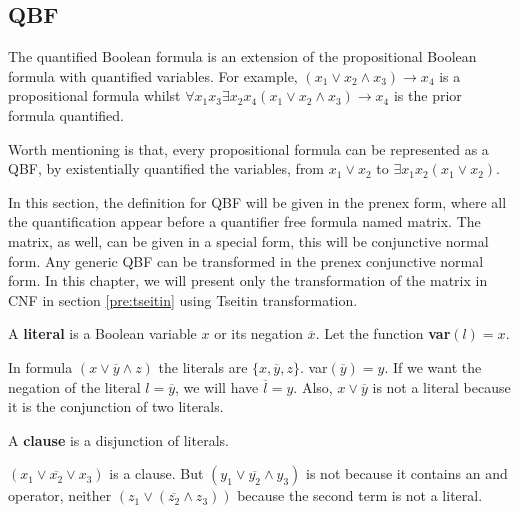 \subsection{QBF}

The quantified Boolean formula is an extension of the propositional Boolean formula with quantified variables. For example, $(x_1 \lor x_2 \land x_3) \to x_4$ is a propositional formula whilst $\forall x_1x_3 \exists x_2x_4(x_1 \lor x_2 \land x_3) \to x_4$ is the prior formula quantified.

Worth mentioning is that, every propositional formula can be represented as a QBF, by existentially quantified the variables, from $x_1 \lor x_2$ to $\exists x_1x_2 (x_1 \lor x_2)$.

In this section, the definition for QBF will be given in the prenex form, where all the quantification appear before a quantifier free formula named matrix. The matrix, as well, can be given in a special form, this will be conjunctive normal form. Any generic QBF can be transformed in the prenex conjunctive normal form. In this chapter, we will present only the transformation of the matrix in CNF in section \ref{pre:tseitin} using Tseitin transformation.

\begin{definition}
    A \textbf{literal} is a Boolean variable $x$ or its negation $\overline{x}$. Let the function \textbf{var}$(l) = x$.
\end{definition}

\begin{example}
    In formula $(x \lor \overline{y} \land z)$ the literals are $\{ x, \overline{y}, z \}$. var$(\overline{y}) = y$. If we want the negation of the literal $l = \overline{y}$, we will have $\overline{l} = y$. Also, $x \lor \overline{y}$ is not a literal because it is the conjunction of two literals.
\end{example}

\begin{definition}
    A \textbf{clause} is a disjunction of literals.
\end{definition}

\begin{example}
    $(x_1 \lor \overline{x_2} \lor x_3)$ is a clause. But $(y_1 \lor \overline{y_2} \land y_3)$ is not because it contains an and operator, neither $(z_1 \lor (\overline{z_2} \land z_3))$ because the second term is not a literal.
\end{example}

